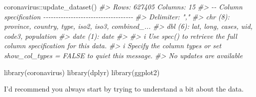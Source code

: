 \documentclass[
]{book}
\newenvironment{Shaded}{\begin{snugshade}}{\end{snugshade}}
\newcommand{\CommentTok}[1]{\textcolor[rgb]{0.56,0.35,0.01}{\textit{#1}}}
\newcommand{\FunctionTok}[1]{\textcolor[rgb]{0.00,0.00,0.00}{#1}}
\newcommand{\NormalTok}[1]{#1}
\newcommand{\SpecialCharTok}[1]{\textcolor[rgb]{0.00,0.00,0.00}{#1}}
\begin{document}
\begin{Shaded}
\begin{Highlighting}[]
\NormalTok{coronavirus}\SpecialCharTok{::}\FunctionTok{update\_dataset}\NormalTok{()}
\CommentTok{\#\textgreater{} Rows: 627405 Columns: 15}
\CommentTok{\#\textgreater{} {-}{-} Column specification {-}{-}{-}{-}{-}{-}{-}{-}{-}{-}{-}{-}{-}{-}{-}{-}{-}{-}{-}{-}{-}{-}{-}{-}{-}{-}{-}{-}{-}{-}{-}{-}{-}{-}{-}{-}}
\CommentTok{\#\textgreater{} Delimiter: ","}
\CommentTok{\#\textgreater{} chr  (8): province, country, type, iso2, iso3, combined\_...}
\CommentTok{\#\textgreater{} dbl  (6): lat, long, cases, uid, code3, population}
\CommentTok{\#\textgreater{} date (1): date}
\CommentTok{\#\textgreater{} }
\CommentTok{\#\textgreater{} i Use \textasciigrave{}spec()\textasciigrave{} to retrieve the full column specification for this data.}
\CommentTok{\#\textgreater{} i Specify the column types or set \textasciigrave{}show\_col\_types = FALSE\textasciigrave{} to quiet this message.}
\CommentTok{\#\textgreater{} No updates are available}
\end{Highlighting}
\end{Shaded}

\begin{Shaded}
\begin{Highlighting}[]
\FunctionTok{library}\NormalTok{(coronavirus)}
\FunctionTok{library}\NormalTok{(dplyr)}
\FunctionTok{library}\NormalTok{(ggplot2)}
\end{Highlighting}
\end{Shaded}

I'd recommend you always start by trying to understand a bit about the data.
\end{document}
